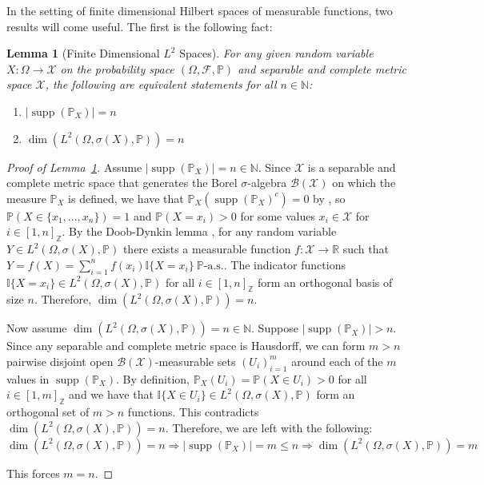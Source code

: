 \documentclass{article}
\newtheorem{lemma}{Lemma}
\begin{document}
In the setting of finite dimensional Hilbert spaces of measurable functions, two results will come useful. The first is the following fact:

\begin{lemma}[Finite Dimensional $L^2$ Spaces] \label{thm:finite-dims}
For any given random variable $X : \Omega \rightarrow \mathcal{X}$ on the probability space $(\Omega, \mathcal{F}, \mathbb{P})$ and separable and complete metric space $\mathcal{X}$, the following are equivalent statements for all $n \in \mathbb{N}$:
\begin{enumerate}    
    \item $|\operatorname{supp}(\mathbb{P}_X)| = n$
    \item $\dim(L^2(\Omega, \sigma(X), \mathbb{P})) = n$
\end{enumerate}
\end{lemma}

\begin{proof}[Proof of Lemma~\ref{thm:finite-dims}]
Assume $|\operatorname{supp}(\mathbb{P}_X)| = n \in \mathbb{N}$. Since $\mathcal{X}$ is a separable and complete metric space that generates the Borel $\sigma$-algebra $\mathcal{B}(\mathcal{X})$ on which the measure $\mathbb{P}_X$ is defined, we have that $\mathbb{P}_X(\operatorname{supp}(\mathbb{P}_X)^c) = 0$ by \cite[Lemma 1.19]{Kallenberg2021-jt}, so $\mathbb{P}(X \in \{x_1, ..., x_n\}) = 1$ and $\mathbb{P}(X = x_i) > 0$ for some values $x_i \in \mathcal{X}$ for $i \in [1, n]_\mathbb{Z}$. By the Doob-Dynkin lemma \cite[Lemma 1.14]{Kallenberg2021-jt}, for any random variable $Y \in L^2(\Omega, \sigma(X), \mathbb{P})$ there exists a measurable function $f : \mathcal{X} \rightarrow \mathbb{R}$ such that $Y = f(X) = \sum_{i=1}^n f(x_i)\mathbb{I}\{X=x_i\} \ \mathbb{P}\text{-a.s.}$. The indicator functions $\mathbb{I}\{X=x_i\} \in L^2(\Omega, \sigma(X), \mathbb{P})$ for all $i \in [1, n]_\mathbb{Z}$ form an orthogonal basis of size $n$. Therefore, $\dim(L^2(\Omega, \sigma(X), \mathbb{P})) = n$.

Now assume $\dim(L^2(\Omega, \sigma(X), \mathbb{P})) = n \in \mathbb{N}$. Suppose $|\operatorname{supp}(\mathbb{P}_X)| > n$. Since any separable and complete metric space is Hausdorff, we can form $m > n$ pairwise disjoint open $\mathcal{B}(\mathcal{X})$-measurable sets $(U_i)_{i=1}^m$ around each of the $m$ values in $\operatorname{supp}(\mathbb{P}_X)$. By definition, $\mathbb{P}_X (U_i) = \mathbb{P}(X \in U_i) > 0$ for all $i \in [1,m]_\mathbb{Z}$ and we have that $\mathbb{I}\{X \in U_i\} \in L^2(\Omega, \sigma(X), \mathbb{P})$ form an orthogonal set of $m > n$ functions. This contradicts $\dim(L^2(\Omega, \sigma(X), \mathbb{P})) = n$. Therefore, we are left with the following:
\begin{equation}
\dim(L^2(\Omega, \sigma(X), \mathbb{P})) = n \Rightarrow |\operatorname{supp}(\mathbb{P}_X)| = m \leq n \Rightarrow \dim(L^2(\Omega, \sigma(X), \mathbb{P})) = m
\end{equation}

This forces $m = n$.
\end{proof}
\end{document}
